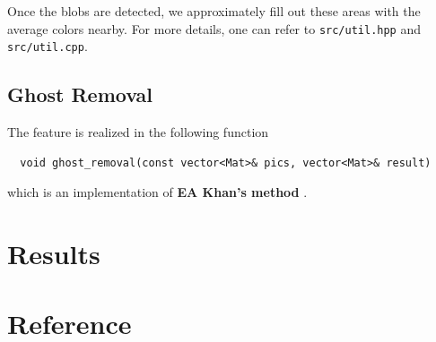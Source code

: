 \documentclass[11pt]{article}
\begin{document}
Once the blobs are detected, we approximately fill out these areas with the average colors nearby. For more details, one can refer to \texttt{src/util.hpp} and \texttt{src/util.cpp}. 

\subsection{Ghost Removal}
The feature is realized in the following function
\begin{lstlisting}
  void ghost_removal(const vector<Mat>& pics, vector<Mat>& result)
\end{lstlisting}
which is an implementation of \textbf{EA Khan's method} \cite{ref:ghost-removal}.

\section{Results}

\begin{figure}[!ht]
  \centering
  \label{distort}
\end{figure}

\section{Reference}


\end{document}
